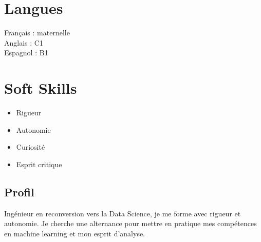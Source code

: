 \documentclass[a4paper,12pt]{article}
\begin{document}
\begin{paracol}{2}
\begin{leftcolumn}
\begin{minipage}[t][\dimexpr\textheight - 9em\relax][t]{\dimexpr\linewidth}
{    \vspace{1em}
    \section*{Langues}
    Français : maternelle\\
    Anglais : C1\\
    Espagnol : B1

    \vspace{1em}
    \section*{Soft Skills}
    \begin{itemize}[leftmargin=1em, nosep]
      \item Rigueur
      \item Autonomie
      \item Curiosité
      \item Esprit critique
    \end{itemize}


    } %
  \end{minipage}
\end{leftcolumn}

\begin{rightcolumn}
\begin{minipage}[t][\dimexpr\textheight - 9em\relax][t]{\dimexpr\linewidth - 1.5em\relax}
  \hspace*{1em}
  \parbox{\dimexpr\linewidth - 1.5em\relax}{

  \section*{Profil}
  Ingénieur en reconversion vers la Data Science, je me forme avec rigueur et autonomie.
  Je cherche une alternance pour mettre en pratique mes compétences en machine learning et mon esprit d’analyse.

}
\end{minipage}
\end{rightcolumn}
\end{paracol}
\end{document}

